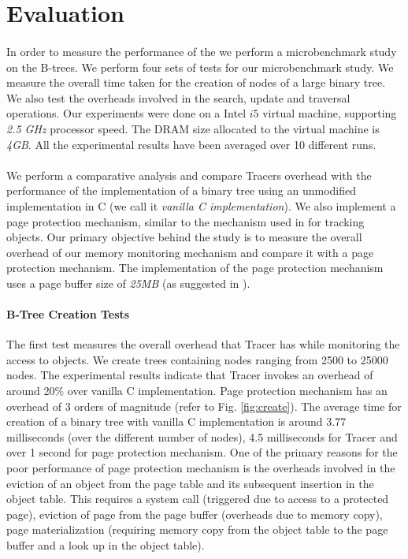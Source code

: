 \section{Evaluation}
\label{sec:eval}
\paragraph{}
In order to measure the performance of the we perform a microbenchmark study on the B-trees. We perform four sets of tests for our microbenchmark study. We measure the overall time taken for the creation of nodes of a large binary tree. We also test the overheads involved in the search, update and traversal operations. Our experiments were done on a Intel $i5$ virtual machine, supporting {\emph{2.5 GHz}} processor speed. The DRAM size allocated to the virtual machine is {\emph{4GB}}. All the experimental results have been averaged over 10 different runs. 

\paragraph{}
We perform a comparative analysis and compare Tracers overhead with the performance of the implementation of a binary tree using an unmodified implementation in C (we call it {\emph{vanilla C implementation}}). We also implement a page protection mechanism, similar to the mechanism used in \cite{SSDAlloc} for tracking objects. Our primary objective behind the study is to measure the overall overhead of our memory monitoring mechanism and compare it with a page protection mechanism. The implementation of the page protection mechanism uses a page buffer size of {\emph{25MB}} (as suggested in \cite{SSDAlloc}).

\paragraph{B-Tree Creation Tests}
The first test measures the overall overhead that Tracer has while monitoring the access to objects. We create trees containing nodes ranging from 2500 to 25000 nodes. The experimental results indicate that Tracer invokes an overhead of around 20\% over vanilla C implementation. Page protection mechanism has an overhead of 3 orders of magnitude (refer to Fig. \ref{fig:create}). The average time for creation of a binary tree with vanilla C implementation is around 3.77 milliseconds (over the different number of nodes), 4.5 milliseconds for Tracer and over 1 second for page protection mechanism. One of the primary reasons for the poor performance of page protection mechanism is the overheads involved in the eviction of an object from the page table and its subsequent insertion in the object table. This requires a system call (triggered due to access to a protected page), eviction of page from the page buffer (overheads due to memory copy), page materialization (requiring memory copy from the object table to the page buffer and a look up in the object table). 

